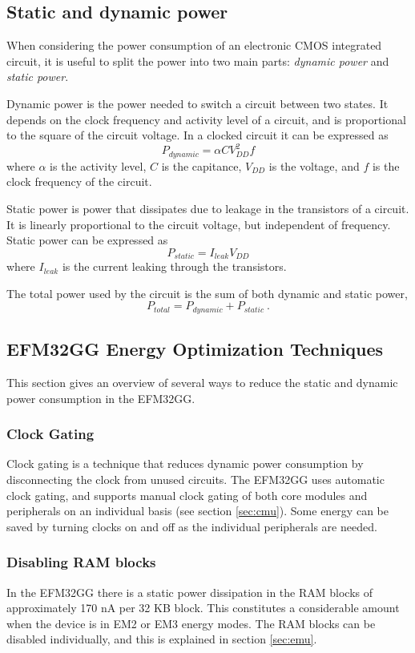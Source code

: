 \subsection{Static and dynamic power}
When considering the power consumption of an electronic CMOS integrated circuit, it is useful to split the power into two main parts: \emph{dynamic power} and \emph{static power}. 

Dynamic power is the power needed to switch a circuit between two states. It depends on the clock frequency and activity level of a circuit, and is proportional to the square of the circuit voltage. In a clocked circuit it can be expressed as
$$P_{dynamic} = \alpha CV_{DD}^{2}f$$
where $\alpha$ is the activity level, $C$ is the capitance, $V_{DD}$ is the voltage, and $f$ is the clock frequency of the circuit.

Static power is power that dissipates due to leakage in the transistors of a circuit. It is linearly proportional to the circuit voltage, but independent of frequency. Static power can be expressed as
$$P_{static} = I_{leak}V_{DD}$$
where $I_{leak}$ is the current leaking through the transistors.

The total power used by the circuit is the sum of both dynamic and static power,
$$P_{total} = P_{dynamic} + P_{static}\ .$$
\cite{cmos-vlsi-design}


\subsection{EFM32GG Energy Optimization Techniques}
This section gives an overview of several ways to reduce the static and dynamic power consumption in the EFM32GG.

\subsubsection{Clock Gating}
Clock gating is a technique that reduces dynamic power consumption by disconnecting the clock from unused circuits. The EFM32GG uses automatic clock gating, and supports manual clock gating of both core modules and peripherals on an individual basis (see section \ref{sec:cmu}). Some energy can be saved by turning clocks on and off as the individual peripherals are needed.\cite{efm32-energy-optimization} 


\subsubsection{Disabling RAM blocks}
In the EFM32GG there is a static power dissipation in the RAM blocks of approximately 170 nA per 32 KB block. This constitutes a considerable amount when the device is in EM2 or EM3 energy modes. The RAM blocks can be disabled individually, and this is explained in section \ref{sec:emu}.\cite{efm32-energy-optimization}



